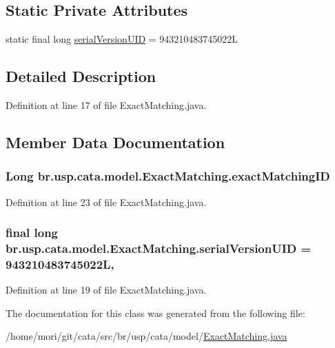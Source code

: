 \subsection*{Static Private Attributes}
\begin{DoxyCompactItemize}
\item 
static final long \hyperlink{classbr_1_1usp_1_1cata_1_1model_1_1_exact_matching_ad12ffa8a216019a858649b4ea7b21b7f}{serial\+Version\+U\+I\+D} = 943210483745022\+L
\end{DoxyCompactItemize}


\subsection{Detailed Description}


Definition at line 17 of file Exact\+Matching.\+java.



\subsection{Member Data Documentation}
\hypertarget{classbr_1_1usp_1_1cata_1_1model_1_1_exact_matching_a43fc6377284129a2373c4067b22ef966}{
\subsubsection[{exact\+Matching\+I\+D}]{\setlength{\rightskip}{0pt plus 5cm}Long br.\+usp.\+cata.\+model.\+Exact\+Matching.\+exact\+Matching\+I\+D\hspace{0.3cm}{\ttfamily [private]}}}\label{classbr_1_1usp_1_1cata_1_1model_1_1_exact_matching_a43fc6377284129a2373c4067b22ef966}


Definition at line 23 of file Exact\+Matching.\+java.

\hypertarget{classbr_1_1usp_1_1cata_1_1model_1_1_exact_matching_ad12ffa8a216019a858649b4ea7b21b7f}{
\subsubsection[{serial\+Version\+U\+I\+D}]{\setlength{\rightskip}{0pt plus 5cm}final long br.\+usp.\+cata.\+model.\+Exact\+Matching.\+serial\+Version\+U\+I\+D = 943210483745022\+L\hspace{0.3cm}{\ttfamily [static]}, {\ttfamily [private]}}}\label{classbr_1_1usp_1_1cata_1_1model_1_1_exact_matching_ad12ffa8a216019a858649b4ea7b21b7f}


Definition at line 19 of file Exact\+Matching.\+java.



The documentation for this class was generated from the following file\+:\begin{DoxyCompactItemize}
\item 
/home/mori/git/cata/src/br/usp/cata/model/\hyperlink{_exact_matching_8java}{Exact\+Matching.\+java}\end{DoxyCompactItemize}
